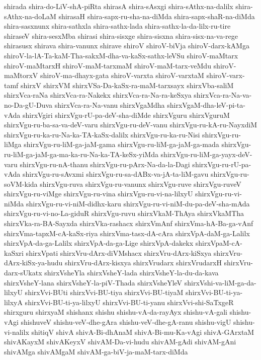 {shirada
shira-do-LiV-shA-piRta
shirasA
shira-sAsxgi
shira-sAthx-na-dalilx
shira-sAthx-na-doLaM
shirasaH
shira-sapx-ru-sha-na-diMda
shira-sapx-shaR-na-diMda
shira-sasxnunx
shira-sathxla
shira-sathx-lada
shira-sathx-la-da-lilx-ru-tire
shiraseV
shira-sesxMba
shirasi
shira-sisxge
shira-sisxna
shira-sisx-na-va-rege
shirasusx
shirava
shira-vanunx
shirave
shiroV
shiroV-biVja
shiroV-darx-kAMga
shiroV-la-lA-Ta-kaM-Tha-sakxM-dha-va-kaSx-sathx-leVSu
shiroV-maMtarx
shiroV-maMtarxH
shiroV-maM-tarxmaM
shiroV-maM-tarx-veMdu
shiroV-maMtorxV
shiroV-ma-dhayx-gata
shiroV-varxta
shiroV-varxtaM
shiroV-varx-tamf
shirxV
shirxVM
shirxVSa-Da-kaSx-ra-maM-tarxsayx
shirxVba-saliM
shirxVca-raNa
shirxVca-ra-Nakekx
shirxVca-ra-Na-ra-keSxya
shirxVca-ra-Na-va-no-Da-gU-Duva
shirxVca-ra-Na-vanu
shirxVgaMdha
shirxVgaM-dha-leV-pi-ta-vAda
shirxVgiri
shirxVgu-rU-pa-deV-sha-diMde
shirxVguru
shirxVguruM
shirxVgu-ru-ba-sa-va-deV-varu
shirxVgu-ru-deV-vanu
shirxVgu-ru-kA-ru-NayxdiM
shirxVgu-ru-ka-ru-Na-ka-TA-kaSx-dalilx
shirxVgu-ru-ka-ru-Nisi
shirxVgu-ru-liMga
shirxVgu-ru-liM-ga-jaM-gama
shirxVgu-ru-liM-ga-jaM-ga-mada
shirxVgu-ru-liM-ga-jaM-ga-ma-ka-ru-Na-ka-TA-keSx-yiMda
shirxVgu-ru-liM-ga-yayx-deV-varu
shirxVgu-ru-nA-thanu
shirxVgu-ru-pArx-Na-da-la-Dagi
shirxVgu-ru-rU-pa-vAda
shirxVgu-ru-sAvxmi
shirxVgu-ru-sa-dABx-va-jA-ta-liM-gavu
shirxVgu-ru-soVM-kida
shirxVgu-ruva
shirxVgu-ru-vanunx
shirxVgu-ruve
shirxVgu-ruveV
shirxVgu-ru-viMge
shirxVgu-ru-vina
shirxVgu-ru-vi-na-lilxyU
shirxVgu-ru-vi-niMda
shirxVgu-ru-vi-niM-didhx-karu
shirxVgu-ru-vi-niM-du-pa-deV-sha-mAda
shirxVgu-ru-vi-no-La-giduR
shirxVgu-ruvu
shirxVkaM-ThAya
shirxVkaMTha
shirxVka-ra-BA-Sayxda
shirxVka-rashacx
shirxVmAnf
shirxVma-hA-Ba-ga-vAnf
shirxVma-tapxM-cA-kaSx-riya
shirxVma-tasx-dA-cAra
shirxVpA-daM-ga-Lalilx
shirxVpA-da-ga-Lalilx
shirxVpA-da-ga-Lige
shirxVpA-dakekx
shirxVpaM-cA-kaSxri
shirxVpati
shirxVru-dArx-diVMshacx
shirxVru-dArx-kiSxya
shirxVru-dArx-kiSx-ya-hudu
shirxVru-dArx-kisxya
shirxVrudarx
shirxVrudarxH
shirxVru-darx-sUkatx
shirxVsheYla
shirxVsheY-lada
shirxVsheY-la-du-da-kava
shirxVsheY-lana
shirxVsheY-la-piV-Thada
shirxVsheYleV
shirxVshi-va-liM-ga-da-lilxyU
shirxVvi-BUti
shirxVvi-BU-tiya
shirxVvi-BU-tiyaM
shirxVvi-BU-ti-ya-lilxyA
shirxVvi-BU-ti-ya-lilxyU
shirxVvi-BU-ti-yanu
shirxVvi-shi-SaTxgeR
shirxguru
shirxyaM
shishanx
shishu
shishu-vA-da-rayAyx
shishu-vA-gali
shishu-vAgi
shishuveV
shishu-veV-dhe-gAra
shishu-veV-dhe-gA-ranu
shishu-vigU
shishu-vi-nalilx
shitiqV
shivA
shivA-Bi-dhAnaM
shivA-Bi-mu-Ka-vAgi
shivA-GArxtaM
shivAKayxM
shivAKeyxV
shivAM-Da-vi-hudu
shivAM-gAdi
shivAM-gAni
shivAMga
shivAMgaM
shivAM-ga-biV-ja-maM-tarx-diMda
}
